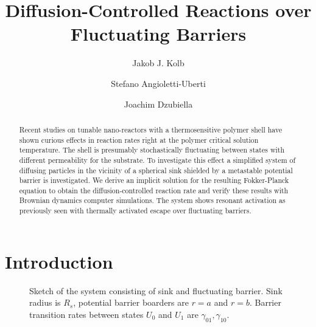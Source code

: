 \documentclass[twocolumn,superscriptaddress]{revtex4}
\begin{document}
 

\title{Diffusion-Controlled Reactions over Fluctuating Barriers} 

\author{Jakob J. Kolb}
\author{Stefano Angioletti-Uberti}
\author{Joachim Dzubiella}



\begin{abstract}
Recent studies on tunable nano-reactors with a thermosensitive polymer shell have shown curious effects in reaction rates
right at the polymer critical solution temperature.
The shell is presumably stochastically fluctuating between states with different permeability for the substrate.
To investigate this effect a simplified system of diffusing particles in the vicinity of a spherical sink shielded by a metastable potential barrier is investigated. We derive an implicit solution for the resulting Fokker-Planck equation to obtain the diffusion-controlled reaction rate and verify these results with Brownian dynamics computer simulations. The system shows resonant activation as previously seen with thermally activated escape over fluctuating barriers.


\end{abstract}

\maketitle

\section{Introduction}


\begin{figure}[H]
    
    \caption{Sketch of the system consisting of sink and fluctuating barrier. Sink radius is $R_s$, potential barrier boarders are $r=a$ and $r=b$. Barrier transition rates between states $U_0$ and $U_1$ are $\gamma_{01}, \gamma_{10}$.}
\label{fig0}
\end{figure}
\end{document}
